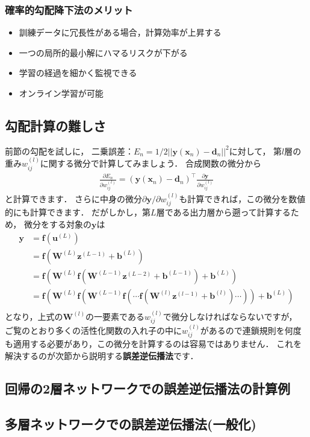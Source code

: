 \documentclass[a4paper,10pt]{jsarticle}
\theoremstyle{definition}
\newcommand{\eq}[1]{\begin{align}#1\end{align}}
\newcommand{\items}[1]{\begin{itemize}#1\end{itemize}}
\begin{document}
\subsubsection*{確率的勾配降下法のメリット}
\items{
	\item 訓練データに冗長性がある場合，計算効率が上昇する
	\item 一つの局所的最小解にハマるリスクが下がる
	\item 学習の経過を細かく監視できる
	\item オンライン学習が可能
}
%
\subsection{勾配計算の難しさ}
前節の勾配を試しに，
二乗誤差：$E_n=1/2||\mathbf{y}(\mathbf{x}_n)-\mathbf{d}_n||^2$に対して，
第$l$層の重み$w_{ij}^{(l)}$に関する微分で計算してみましょう．
合成関数の微分から
\eq{\frac{\partial E_n}{\partial w_{ij}^{(l)}}=(\mathbf{y}(\mathbf{x}_n)-\mathbf{d}_n)^\top\frac{\partial\mathbf{y}}{\partial w_{ij}^{(l)}}}
と計算できます．
さらに中身の微分$\partial\mathbf{y} / \partial w_{ij}^{(l)}$も計算できれば，この微分を数値的にも計算できます．
だがしかし，第$L$層である出力層から遡って計算するため，
微分をする対象の$\mathbf{y}$は
\eq{\mathbf{y}
	&=\mathbf{f}\left(\mathbf{u}^{(L)}\right)\\
	&=\mathbf{f}\left(\mathbf{W}^{(L)}\mathbf{z}^{(L-1)}+\mathbf{b}^{(L)}\right)\\
	&=\mathbf{f}\left(\mathbf{W}^{(L)}\mathbf{f}(\mathbf{W}^{(L-1)}\mathbf{z}^{(L-2)}+\mathbf{b}^{(L-1)})+\mathbf{b}^{(L)}\right)\\
	&=\mathbf{f}\left(\mathbf{W}^{(L)}\mathbf{f}(\mathbf{W}^{(L-1)}\mathbf{f}(\cdots\mathbf{f}(\mathbf{W}^{(l)}\mathbf{z}^{(l-1)}+\mathbf{b}^{(l)})\cdots))+\mathbf{b}^{(L)}\right)\\
	}
となり，上式の$\mathbf{W}^{(l)}$の一要素である$w_{ij}^{(l)}$で微分しなければならないですが，
ご覧のとおり多くの活性化関数の入れ子の中に$w_{ij}^{(l)}$があるので連鎖規則を何度も適用する必要があり，この微分を計算するのは容易ではありません．
これを解決するのが次節から説明する\textbf{誤差逆伝播法}です．
%
\subsection{回帰の2層ネットワークでの誤差逆伝播法の計算例}

%
\subsection{多層ネットワークでの誤差逆伝播法(一般化)}
\end{document}
